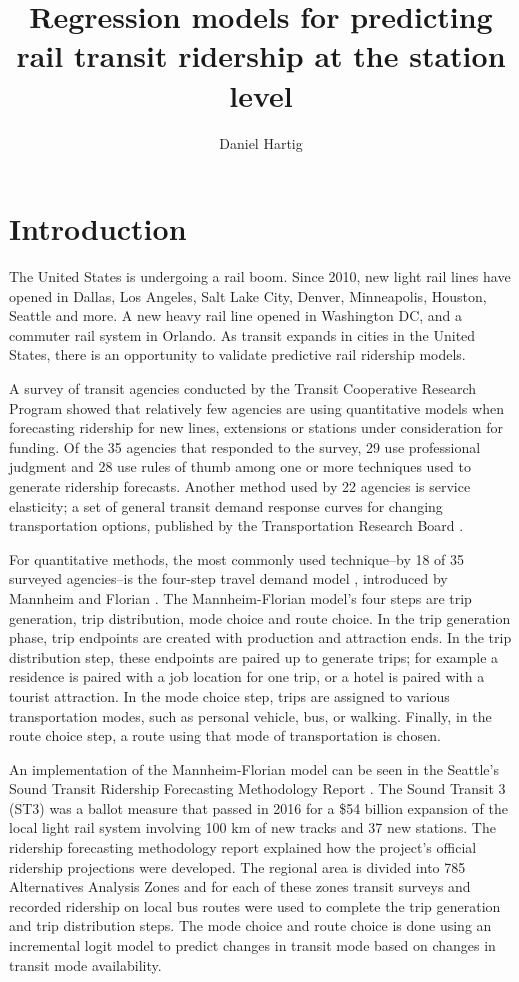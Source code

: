 \documentclass[11pt]{article}
\title{Regression models for predicting rail transit ridership at the station level}
\author{Daniel Hartig}
\date{\vspace{-5ex}}
\begin{document}
\maketitle

\section{Introduction}

The United States is undergoing a rail boom. Since 2010, new light rail lines have opened in Dallas, Los Angeles, Salt Lake City, Denver, Minneapolis, Houston, Seattle and more.  A new heavy rail line opened in Washington DC, and a commuter rail system in Orlando. As transit expands in cities in the United States, there is an opportunity to validate predictive rail ridership models. 

A survey of transit agencies \cite{Boyle2006} conducted by the Transit Cooperative Research Program showed that relatively few agencies are using quantitative models when forecasting ridership for new lines, extensions or stations under consideration for funding. Of the 35 agencies that responded to the survey, 29 use professional judgment and 28 use rules of thumb among one or more techniques used to generate ridership forecasts. Another method used by 22 agencies is service elasticity; a set of general transit demand response curves for changing transportation options, published by the Transportation Research Board \cite{tcrp95}. 

For quantitative methods, the most commonly used technique--by 18 of 35 surveyed agencies--is the four-step travel demand model \cite{McNally2008}, introduced by Mannheim and Florian \cite{Mannheim1979, Florian1988}. The Mannheim-Florian model's four steps are trip generation, trip distribution, mode choice and route choice. In the trip generation phase, trip endpoints are created with production and attraction ends. In the trip distribution step, these endpoints are paired up to generate trips; for example a residence is paired with a job location for one trip, or a hotel is paired with a tourist attraction. In the mode choice step, trips are assigned to various transportation modes, such as personal vehicle, bus, or walking. Finally, in the route choice step, a route using that mode of transportation is chosen.

An implementation of the Mannheim-Florian model can be seen in the Seattle's Sound Transit Ridership Forecasting Methodology Report \cite{ST3_2015, ST3_add}. The Sound Transit 3 (ST3) was a ballot measure that passed in 2016 for a \$54 billion expansion of the local light rail system involving 100 km of new tracks and 37 new stations. The ridership forecasting methodology report explained how the project's official ridership projections were developed. The regional area is divided into 785 Alternatives Analysis Zones and for each of these zones transit surveys and recorded ridership on local bus routes were used to complete the trip generation and trip distribution steps. The mode choice and route choice is done using an incremental logit model to predict changes in transit mode based on changes in transit mode availability.
\end{document}
